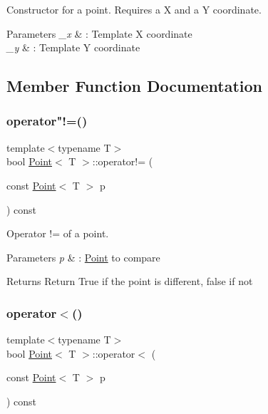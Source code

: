 Constructor for a point. Requires a X and a Y coordinate. 


\begin{DoxyParams}{Parameters}
{\em \+\_\+x} & \+: Template X coordinate \\
\hline
{\em \+\_\+y} & \+: Template Y coordinate \\
\hline
\end{DoxyParams}


\subsection{Member Function Documentation}
\mbox{\label{classPoint_accaa0100c0c631ad03280446a0b05339}} 
\subsubsection{\texorpdfstring{operator"!=()}{operator!=()}}
{\footnotesize\ttfamily template$<$typename T$>$ \\
bool \hyperlink{classPoint}{Point}$<$ T $>$\+::operator!= (\begin{DoxyParamCaption}\item[{const \hyperlink{classPoint}{Point}$<$ T $>$}]{p }\end{DoxyParamCaption}) const\hspace{0.3cm}{\ttfamily [inline]}}



Operator != of a point. 


\begin{DoxyParams}{Parameters}
{\em p} & \+: \hyperlink{classPoint}{Point} to compare \\
\hline
\end{DoxyParams}
\begin{DoxyReturn}{Returns}
Return True if the point is different, false if not 
\end{DoxyReturn}
\mbox{\label{classPoint_ac6b57554a6941b07668b52c66fe20fae}} 
\subsubsection{\texorpdfstring{operator$<$()}{operator<()}}
{\footnotesize\ttfamily template$<$typename T$>$ \\
bool \hyperlink{classPoint}{Point}$<$ T $>$\+::operator$<$ (\begin{DoxyParamCaption}\item[{const \hyperlink{classPoint}{Point}$<$ T $>$}]{p }\end{DoxyParamCaption}) const\hspace{0.3cm}{\ttfamily [inline]}}



